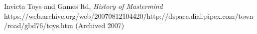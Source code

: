 \documentclass[12pt]{article}  %
\theoremstyle{definition}
\theoremstyle{remark}
\begin{document}
%
%
%
\begin{thebibliography}{99}

% 
%



%

%




Invicta Toys and Games ltd,
{\em History of Mastermind}
https://web.archive.org/web/20070812104420/http://dspace.dial.pipex.com/town/road/gbd76/toys.htm
(Archived 2007)
\end{thebibliography}
\end{document}
